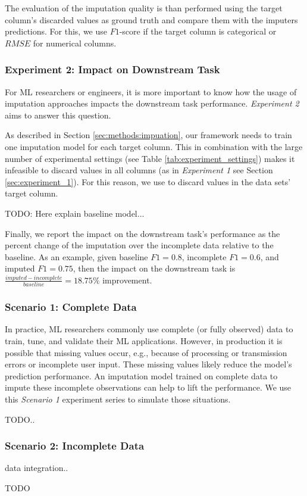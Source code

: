 The evaluation of the imputation quality is than performed using the target column's discarded values as ground truth and compare them with the imputers predictions. For this, we use $F1$-score if the target column is categorical or $RMSE$ for numerical columns.


\subsubsection{Experiment 2: Impact on Downstream Task}
%
For ML researchers or engineers, it is more important to know how the usage of imputation approaches impacts the downstream task performance. \emph{Experiment 2} aims to answer this question.

As described in Section \ref{sec:methods:impuation}, our framework needs to train one imputation model for each target column. This in combination with the large number of experimental settings (see Table \ref{tab:experiment_settings}) makes it infeasible to discard values in all columns (as in \emph{Experiment 1} see Section \ref{sec:experiment_1}). For this reason, we use  to discard values in the data sets' target column.

TODO: Here explain baseline model...

Finally, we report the impact on the downstream task's performance as the percent change of the imputation over the incomplete data relative to the baseline. As an example, given baseline $F1 = 0.8$, incomplete $F1 = 0.6$, and imputed $F1 = 0.75$, then the impact on the downstream task is $\frac{imputed - incomplete}{baseline} = 18.75\%$ improvement.


\subsubsection{Scenario 1: Complete Data}
%
In practice, ML researchers commonly use complete (or fully observed) data to train, tune, and validate their ML applications. However, in production it is possible that missing values occur, e.g., because of processing or transmission errors or incomplete user input. These missing values likely reduce the model's prediction performance. An imputation model trained on complete data to impute these incomplete observations can help to lift the performance. We use this \emph{Scenario 1} experiment series to simulate those situations.

TODO..


\subsubsection{Scenario 2: Incomplete Data}
%


data integration..

TODO
